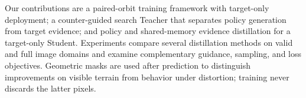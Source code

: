 Our contributions are a paired-orbit training framework with target-only deployment; a counter-guided search Teacher that separates policy generation from target evidence; and policy and shared-memory evidence distillation for a target-only Student. Experiments compare several distillation methods on valid and full image domains and examine complementary guidance, sampling, and loss objectives. Geometric masks are used after prediction to distinguish improvements on visible terrain from behavior under distortion; training never discards the latter pixels.
